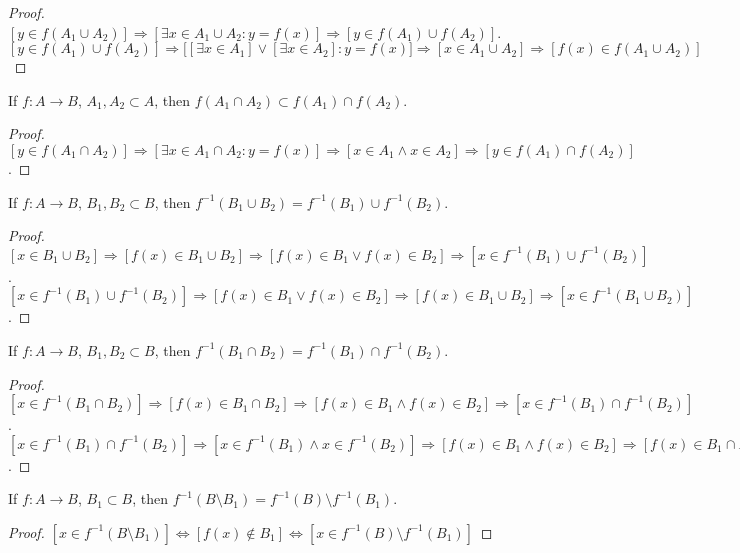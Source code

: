 \documentclass[crop=false,class=book,oneside]{standalone}                      %
\begin{document}
        \begin{proof}
        $[y\in f(A_1\cup A_2)]\Rightarrow [\exists x\in A_1 \cup A_2:y=f(x)]\Rightarrow [y \in f(A_1)\cup f(A_2)]$. $[y\in f(A_1)\cup f(A_2)]\Rightarrow \big[[\exists x\in A_1] \lor [\exists x\in A_2]: y=f(x)\big]\Rightarrow [x\in A_1\cup A_2]\Rightarrow [f(x)\in f(A_1\cup A_2)]$
        \end{proof}
        \begin{theorem}
        If $f:A\rightarrow B$, $A_1,A_2\subset A$, then $f(A_1\cap A_2)\subset f(A_1)\cap f(A_2)$.
        \end{theorem}
        \begin{proof}
        $[y\in f(A_1 \cap A_2)]\Rightarrow [\exists x\in A_1 \cap A_2:y=f(x)]\Rightarrow [x\in A_1 \land x \in A_2] \Rightarrow[y \in f(A_1)\cap f(A_2)]$.
        \end{proof}
        \begin{theorem}
        If $f:A\rightarrow B$, $B_1,B_2\subset B$, then $f^{-1}(B_1\cup B_2) = f^{-1}(B_1)\cup f^{-1}(B_2)$.
        \end{theorem}
        \begin{proof}
        $[x\in B_1\cup B_2]\Rightarrow [f(x)\in B_1\cup B_2]\Rightarrow [f(x)\in B_1\lor f(x)\in B_2]\Rightarrow [x\in f^{-1}(B_1)\cup f^{-1}(B_2)]$. $[x \in f^{-1}(B_1)\cup f^{-1}(B_2)]\Rightarrow [f(x)\in B_1\lor f(x) \in B_2]\Rightarrow [f(x) \in B_1\cup B_2]\Rightarrow [x\in f^{-1}(B_1\cup B_2)]$.
        \end{proof}
        \begin{theorem}
        If $f:A\rightarrow B$, $B_1,B_2\subset B$, then $f^{-1}(B_1\cap B_2) = f^{-1}(B_1)\cap f^{-1}(B_2)$.
        \end{theorem}
        \begin{proof}
        $[x\in f^{-1}(B_1\cap B_2)]\Rightarrow [f(x) \in B_1 \cap B_2]\Rightarrow [f(x)\in B_1\land f(x) \in B_2 ]\Rightarrow [x\in f^{-1}(B_1)\cap f^{-1}(B_2)]$. $[x\in f^{-1}(B_1)\cap f^{-1}(B_2)]\Rightarrow [x\in f^{-1}(B_1)\land x\in f^{-1}(B_2)]\Rightarrow [f(x) \in B_1\land f(x) \in B_2]\Rightarrow [f(x)\in B_1\cap B_2]\Rightarrow [x\in f^{-1}(B_1\cap B_2)]$.
        \end{proof}
        \begin{theorem}
        If $f:A\rightarrow B$, $B_1 \subset B$, then $f^{-1}(B\setminus B_1) = f^{-1}(B)\setminus f^{-1}(B_1)$.
        \end{theorem}
        \begin{proof}
        $[x\in f^{-1}(B\setminus B_1)]\Leftrightarrow [f(x)\notin B_1]\Leftrightarrow [x\in f^{-1}(B)\setminus f^{-1}(B_1)]$
        \end{proof}
\end{document}

